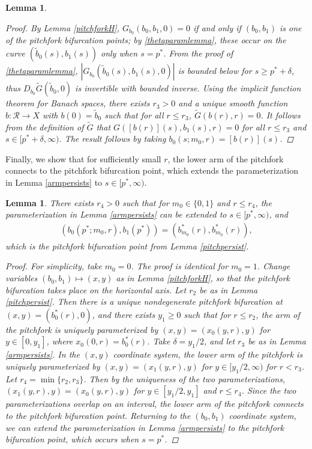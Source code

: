 \documentclass[10pt,reqno]{amsart}
\theoremstyle{plain}
\newtheorem{lemma}[theorem]{Lemma}
\theoremstyle{definition}
\theoremstyle{remark}
\numberwithin{theorem}{section}
\numberwithin{equation}{section}
\begin{document}
\begin{lemma}
\begin{proof}
By Lemma \ref{pitchforkH}, $G_{b_0}(b_0, b_1, 0) = 0$ if and only if $(b_0, b_1)$ is one of the pitchfork bifurcation points; by \cref{thetaparamlemma}, these occur on the curve $(\tilde{b}_0(s), b_1(s))$ only when $s = p^*$. From the proof of \cref{thetaparamlemma}, $|G_{b_0}(\tilde{b}_0(s), b_1(s), 0)|$ is bounded below for $s \geq p^* + \delta$, thus $D_{b_0} \tilde{G}(\tilde{b}_0, 0)$ is invertible with bounded inverse. Using the implicit function theorem for Banach spaces, there exists $r_3 > 0$ and a unique smooth function $b: \mathcal{R} \rightarrow X$ with $b(0) = \tilde{b}_0$ such that for all $r \leq r_3$, $\tilde{G}(b(r), r) = 0$. It follows from the definition of $\tilde{G}$ that $G([b(r)](s), b_1(s), r) = 0$ for all $r \leq r_3$ and $s \in [p^* + \delta, \infty)$. The result follows by taking $b_0(s; m_0, r) = [b(r)](s)$.
\end{proof}
\end{lemma} 

Finally, we show that for sufficiently small $r$, the lower arm of the pitchfork connects to the pitchfork bifurcation point, which extends the parameterization in Lemma \ref{armpersists} to $s \in [p^*, \infty)$.

\begin{lemma}\label{pitchforkconnects}
There exists $r_4 > 0$ such that for $m_0 \in \{0, 1\}$ and $r \leq r_4$, the parameterization in Lemma \ref{armpersists} can be extended to $s \in [p^*, \infty)$, and 
\begin{align*}
(b_0(p^*; m_0, r), b_1(p^*)) = (b_{m_0}^*(r), b_{m_0}^*(r)),
\end{align*}
which is the pitchfork bifurcation point from Lemma \ref{pitchpersist}.

\begin{proof}
For simplicity, take $m_0 = 0$. The proof is identical for $m_0 = 1$. Change variables $(b_0, b_1) \mapsto (x, y)$ as in Lemma \ref{pitchforkH}, so that the pitchfork bifurcation takes place on the horizontal axis. Let $r_2$ be as in Lemma \ref{pitchpersist}. Then there is a unique nondegenerate pitchfork bifurcation at $(x, y) = (b_0^*(r), 0)$, and there exists $y_1 \geq 0$ such that for $r \leq r_2$, the arm of the pitchfork is uniquely parameterized by $(x, y) = (x_0(y, r), y)$ for $y \in [0, y_1]$, where $x_0(0, r) = b_0^*(r)$. Take $\delta = y_1/2$, and let $r_3$ be as in Lemma \ref{armpersists}. In the $(x, y)$ coordinate system, the lower arm of the pitchfork is uniquely parameterized by 
$(x, y) = (x_1(y, r), y)$ for  $y \in [y_1/2, \infty)$ for $r < r_3$. Let $r_4 = \min\{ r_2, r_3 \}$. Then by the uniqueness of the two parameterizations, $(x_1(y, r), y) = (x_0(y, r), y)$ for $y \in [y_1/2, y_1]$ and $r \leq r_4$. Since the two parameterizations overlap on an interval, the lower arm of the pitchfork connects to the pitchfork bifurcation point. Returning to the $(b_0, b_1)$ coordinate system, we can extend the parameterization in Lemma \ref{armpersists} to the pitchfork bifurcation point, which occurs when $s = p^*$.
\end{proof}
\end{lemma}
\end{document}
